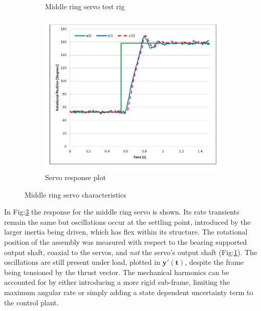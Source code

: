 \begin{figure}[htbp]
\begin{subfigure}{0.46\textwidth}
\caption{Middle ring servo test rig}
\label{fig:servo-middle}
\end{subfigure}
\begin{subfigure}{0.46\textwidth}
\centering
\includegraphics[width=\textwidth]{graphs/servo-step-middle}
\caption{Servo response plot}
\label{fig:servo-step-middle}
\end{subfigure}
\vspace{-5pt}
\caption{Middle ring servo characteristics}
\label{fig:servo-middle-character}
\vspace{-20pt}
\end{figure}
\par
In Fig:\ref{fig:servo-middle-character} the response for the middle ring servo is shown. Its rate transients remain the same but oscillations occur at the settling point, introduced by the larger inertia being driven, which has flex within its structure. The rotational position of the assembly was measured with respect to the bearing supported output shaft, coaxial to the servos, and \emph{not} the servo's output shaft (Fig:\ref{fig:servo-middle}). The oscillations are still present under load, plotted in {\color{Red}$\mathbf{y'(t)}$}, despite the frame being tensioned by the thrust vector. The mechanical harmonics can be accounted for by either introducing a more rigid sub-frame, limiting the maximum angular rate or simply adding a state dependent uncertainty term to the control plant.
